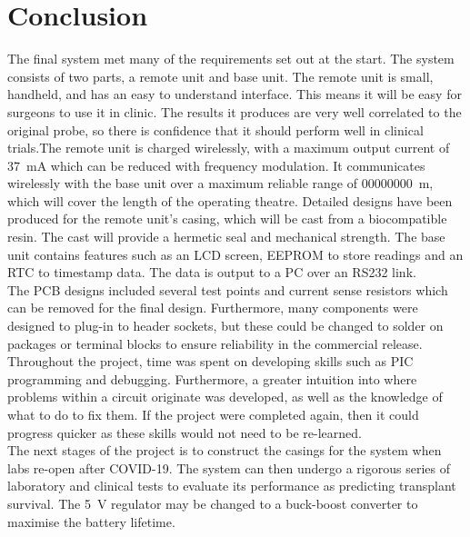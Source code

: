 \section{Conclusion}
The final system met many of the requirements set out at the start. The system consists of two parts, a remote unit and base unit. The remote unit is small, handheld, and has an easy to understand interface. This means it will be easy for surgeons to use it in clinic. The results it produces are very well correlated to the original probe, so there is confidence that it should perform well in clinical trials.The remote unit is charged wirelessly, with a maximum output current of \SI{37}{\milli\ampere} which can be reduced with frequency modulation. It communicates wirelessly with the base unit over a maximum reliable range of \SI{00000000}{\metre}, which will cover the length of the operating theatre. Detailed designs have been produced for the remote unit's casing, which will be cast from a biocompatible resin. The cast will provide a hermetic seal and mechanical strength. The base unit contains features such as an LCD screen, EEPROM to store readings and an RTC to timestamp data. The data is output to a PC over an RS232 link.\\

The PCB designs included several test points and current sense resistors which can be removed for the final design. Furthermore, many components were designed to plug-in to header sockets, but these could be changed to solder on packages or terminal blocks to ensure reliability in the commercial release. Throughout the project, time was spent on developing skills such as PIC programming and debugging. Furthermore, a greater intuition into where problems within a circuit originate was developed, as well as the knowledge of what to do to fix them. If the project were completed again, then it could progress quicker as these skills would not need to be re-learned. \\

The next stages of the project is to construct the casings for the system when labs re-open after COVID-19. The system can then undergo a rigorous series of laboratory and clinical tests to evaluate its performance as predicting transplant survival. The \SI{5}{\volt} regulator may be changed to a buck-boost converter to maximise the battery lifetime.\\